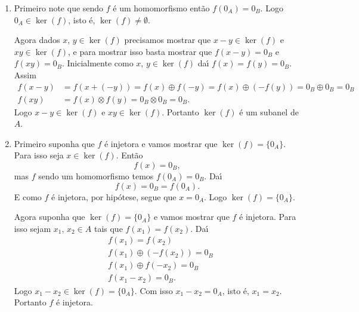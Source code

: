 \begin{prova}
	\begin{enumerate}[label={\roman*})]
		\item Primeiro note que sendo $f$ \'e um homomorfismo ent\~ao $f(0_A) = 0_B$. Logo $0_A \in \ker(f)$, isto \'e, $\ker(f) \ne \emptyset$.

		Agora dados $x$, $y \in \ker(f)$ precisamos mostrar que $x - y \in \ker(f)$ e $xy \in \ker(f)$, e para mostrar isso basta mostrar que $f(x - y) = 0_B$ e$f(xy) = 0_B$. Inicialmente como $x$, $y \in \ker(f)$ da{\'\i} $f(x) = f(y) = 0_B$. Assim
		\begin{align*}
			f(x - y) &= f(x + (-y)) = f(x) \oplus f(-y) = f(x) \oplus (-f(y)) = 0_B \oplus 0_B = 0_B\\
			f(xy) &= f(x)\otimes f(y) = 0_B \otimes 0_B = 0_B.
		\end{align*}
		Logo $x - y \in \ker(f)$ e $xy \in \ker(f)$. Portanto $\ker(f)$ \'e um subanel de $A$.

		\item Primeiro suponha que $f$ \'e injetora e vamos mostrar que $\ker(f) = \{0_A\}$. Para isso seja $x \in \ker(f)$. Ent\~ao
		\[
			f(x) = 0_B,
		\]
		mas $f$ sendo um homomorfismo temos $f(0_A) = 0_B$. Da{\'\i}
		\[
			f(x) = 0_B = f(0_A).
		\]
		E como $f$ \'e injetora, por hip\'otese, segue que $x = 0_A$. Logo $\ker(f) = \{0_A\}$.

		Agora suponha que $\ker(f) = \{0_A\}$ e vamos mostrar que $f$ \'e injetora. Para isso sejam $x_1$, $x_2 \in A$ tais que $f(x_1) = f(x_2)$. Da{\'\i}
		\begin{align*}
			&f(x_1) = f(x_2)\\
			&f(x_1) \oplus (-f(x_2)) = 0_B\\
			&f(x_1) \oplus f(-x_2) = 0_B\\
			&f(x_1 - x_2) = 0_B.
		\end{align*}
		Logo $x_1 - x_2 \in \ker(f) = \{0_A\}$. Com isso $x_1 - x_2 = 0_A$, isto \'e, $x_1 = x_2$. Portanto $f$ \'e injetora.
	\end{enumerate}
\end{prova}

